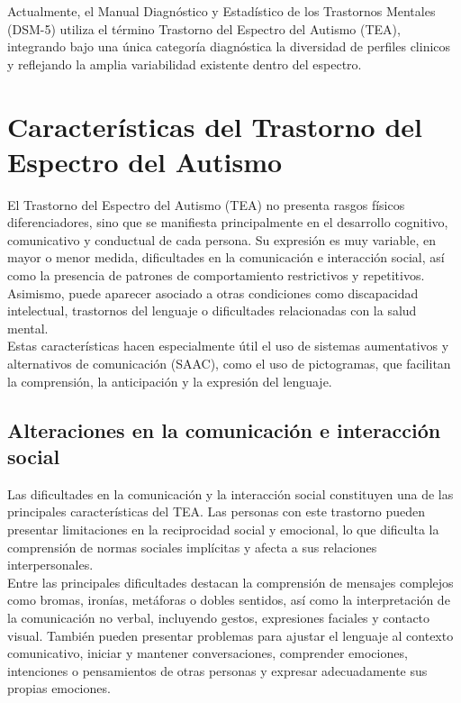 \documentclass{article}
\begin{document}
Actualmente, el Manual Diagnóstico y Estadístico de los Trastornos Mentales (DSM-5) utiliza el término Trastorno del Espectro del Autismo (TEA), integrando bajo una única categoría diagnóstica la diversidad de perfiles clinicos y reflejando la amplia variabilidad existente dentro del espectro.   


\section{\textbf{Características del Trastorno del Espectro del Autismo}}
El Trastorno del Espectro del Autismo (TEA) no presenta rasgos físicos diferenciadores, sino que se manifiesta principalmente en el desarrollo cognitivo, comunicativo y conductual de cada persona. Su expresión es muy variable, en mayor o menor medida, dificultades en la comunicación e interacción social, así como la presencia de patrones de comportamiento restrictivos y repetitivos.\\

Asimismo, puede aparecer asociado a otras condiciones como discapacidad intelectual, trastornos del lenguaje o dificultades relacionadas con la salud mental.\\

Estas características hacen especialmente útil el uso de sistemas aumentativos y alternativos de comunicación (SAAC), como el uso de pictogramas, que facilitan la comprensión, la anticipación y la expresión del lenguaje.

\subsection{\textbf{Alteraciones en la comunicación e interacción social}}
Las dificultades en la comunicación y la interacción social constituyen una de las principales características del TEA. Las personas con este trastorno pueden presentar limitaciones en la reciprocidad social y emocional, lo que dificulta la comprensión de normas sociales implícitas y afecta a sus relaciones interpersonales.\\

Entre las principales dificultades destacan la comprensión de mensajes complejos como bromas, ironías, metáforas o dobles sentidos, así como la interpretación de la comunicación no verbal, incluyendo gestos, expresiones faciales y contacto visual. También pueden presentar problemas para ajustar el lenguaje al contexto comunicativo, iniciar y mantener conversaciones, comprender emociones, intenciones o pensamientos de otras personas y expresar adecuadamente sus propias emociones.\\
\end{document}
